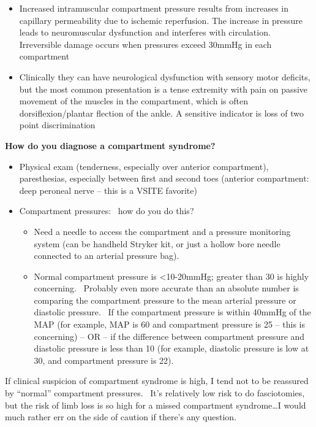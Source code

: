 \documentclass[
]{book}
\begin{document}
\begin{itemize}
\item
  Increased intramuscular compartment pressure results from increases
  in capillary permeability due to ischemic reperfusion. The increase
  in pressure leads to neuromuscular dysfunction and interferes with
  circulation. Irreversible damage occurs when pressures exceed 30mmHg
  in each compartment~~
\item
  Clinically they can have neurological dysfunction with sensory motor
  deficits, but the most common presentation is a tense extremity with
  pain on passive movement of the muscles in the compartment, which is
  often dorsiflexion/plantar flection of the ankle. A sensitive
  indicator is loss of two point discrimination
\end{itemize}

\textbf{How do you diagnose a compartment syndrome?}

\begin{itemize}
\item
  Physical exam (tenderness, especially over anterior compartment),
  paresthesias, especially between first and second toes (anterior
  compartment:~ deep peroneal nerve -- this is a VSITE favorite)
\item
  Compartment pressures:~ how do you do this?

  \begin{itemize}
  \item
    Need a needle to access the compartment and a pressure
    monitoring system (can be handheld Stryker kit, or just a hollow
    bore needle connected to an arterial pressure bag).
  \item
    Normal compartment pressure is \textless10-20mmHg; greater than 30 is
    highly concerning.~ Probably even more accurate than an absolute
    number is comparing the compartment pressure to the mean
    arterial pressure or diastolic pressure.~ If the compartment
    pressure is within 40mmHg of the MAP (for example, MAP is 60 and
    compartment pressure is 25 -- this is concerning) -- OR -- if
    the difference between compartment pressure and diastolic
    pressure is less than 10 (for example, diastolic pressure is low
    at 30, and compartment pressure is 22).
  \end{itemize}
\end{itemize}

If clinical suspicion of compartment syndrome is high, I tend not to be
reassured by ``normal'' compartment pressures.~ It's relatively low risk
to do fasciotomies, but the risk of limb loss is so high for a missed
compartment syndrome\ldots I would much rather err on the side of caution if
there's any question.
\end{document}
